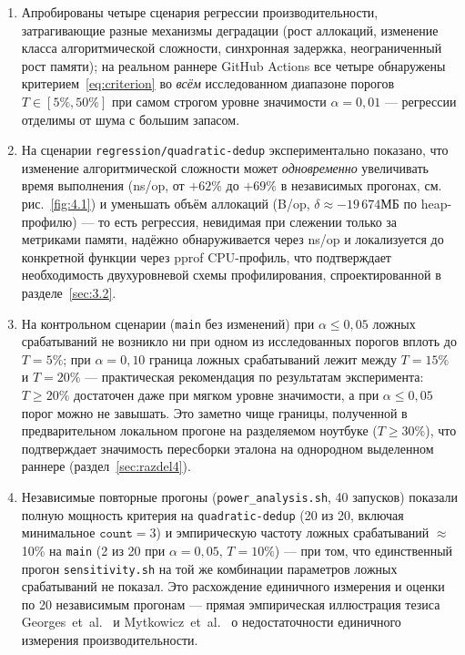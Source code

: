 \documentclass[12pt,a4paper]{article}
\numberwithin{equation}{section}
\begin{document}
\begin{enumerate}
\item Апробированы четыре сценария регрессии производительности,
затрагивающие разные механизмы деградации (рост аллокаций, изменение
класса алгоритмической сложности, синхронная задержка, неограниченный
рост памяти); на реальном раннере GitHub Actions все четыре обнаружены
критерием~\eqref{eq:criterion} во \emph{всём} исследованном диапазоне
порогов $T \in [5\%, 50\%]$ при самом строгом уровне значимости
$\alpha=0{,}01$ — регрессии отделимы от шума с большим запасом.
\item На сценарии \texttt{regression/\allowbreak quadratic-dedup} экспериментально
показано, что изменение алгоритмической сложности может \emph{одновременно}
увеличивать время выполнения (ns/op, от $+62\%$ до $+69\%$ в независимых
прогонах, см. рис.~\ref{fig:4.1}) и уменьшать объём аллокаций (B/op,
$\delta \approx -19\,674$МБ по heap-профилю) — то есть
регрессия, невидимая при слежении только за метриками памяти, надёжно
обнаруживается через ns/op и локализуется до конкретной функции через
pprof CPU-профиль, что подтверждает необходимость двухуровневой схемы
профилирования, спроектированной в разделе~\ref{sec:3.2}.
\item На контрольном сценарии (\texttt{main} без изменений) при
$\alpha \le 0{,}05$ ложных срабатываний не возникло ни при одном из
исследованных порогов вплоть до $T=5\%$; при $\alpha=0{,}10$ граница
ложных срабатываний лежит между $T=15\%$ и $T=20\%$ — практическая
рекомендация по результатам эксперимента: $T \ge 20\%$ достаточен даже
при мягком уровне значимости, а при $\alpha \le 0{,}05$ порог можно не
завышать. Это заметно чище границы, полученной в предварительном
локальном прогоне на разделяемом ноутбуке ($T \ge 30\%$), что подтверждает
значимость пересборки эталона на однородном выделенном раннере
(раздел~\ref{sec:razdel4}).
\item Независимые повторные прогоны (\texttt{power\_analysis.sh}, 40
запусков) показали полную мощность критерия на \texttt{quadratic-dedup}
(20 из 20, включая минимальное $\texttt{count}=3$) и эмпирическую частоту
ложных срабатываний $\approx$10\% на \texttt{main} (2 из 20 при
$\alpha=0{,}05$, $T=10\%$) — при том, что единственный прогон
\texttt{sensitivity.sh} на той же комбинации параметров ложных
срабатываний не показал. Это расхождение единичного измерения и оценки по
20 независимым прогонам — прямая эмпирическая иллюстрация тезиса
Georges~et~al.~\cite{georges2007} и Mytkowicz~et~al.~\cite{mytkowicz2009}
о недостаточности единичного измерения производительности.

\end{enumerate}
\end{document}
